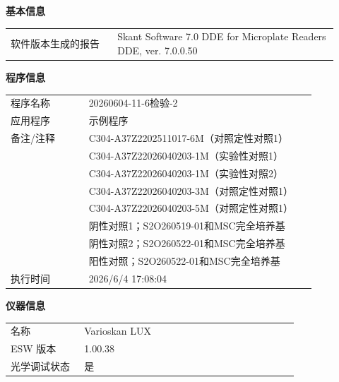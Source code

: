\documentclass[UTF8,10pt,a4paper,fontset=fandol]{ctexart}
\newcommand{\fieldvalue}[1]{#1}
\begin{document}
\medskip
\textbf{基本信息}

\begin{tabular}{@{}p{0.30\linewidth}p{0.62\linewidth}@{}}
软件版本生成的报告 &
\fieldvalue{Skant Software 7.0 DDE for Microplate Readers DDE, ver. 7.0.0.50}
\end{tabular}

\medskip
\textbf{程序信息}

\begin{tabular}{@{}p{0.24\linewidth}p{0.70\linewidth}@{}}
程序名称 &
\fieldvalue{20260604-11-6检验-2}
\\
应用程序 &
\fieldvalue{示例程序}
\\
备注/注释 &
\fieldvalue{C304-A37Z2202511017-6M（对照定性对照1）}
\\
&
\fieldvalue{C304-A37Z22026040203-1M（实验性对照1）}
\\
&
\fieldvalue{C304-A37Z22026040203-1M（实验性对照2）}
\\
&
\fieldvalue{C304-A37Z22026040203-3M（对照定性对照1）}
\\
&
\fieldvalue{C304-A37Z22026040203-5M（对照定性对照1）}
\\
&
\fieldvalue{阴性对照1；S2O260519-01和MSC完全培养基}
\\
&
\fieldvalue{阴性对照2；S2O260522-01和MSC完全培养基}
\\
&
\fieldvalue{阳性对照；S2O260522-01和MSC完全培养基}
\\
执行时间 &
\fieldvalue{2026/6/4 17:08:04}
\end{tabular}

\medskip
\textbf{仪器信息}

\begin{tabular}{@{}p{0.24\linewidth}p{0.70\linewidth}@{}}
名称 &
\fieldvalue{Varioskan LUX}
\\
ESW 版本 &
\fieldvalue{1.00.38}
\\
光学调试状态 &
\fieldvalue{是}
\end{tabular}
\end{document}
